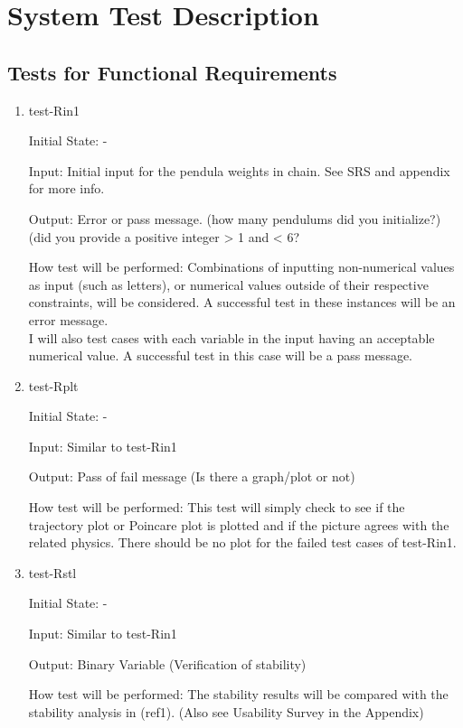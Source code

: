 \documentclass[12pt, titlepage]{article}
\begin{document}


\section{System Test Description}
	
\subsection{Tests for Functional Requirements}

\begin{enumerate}
\item{test-Rin1}	
				
Initial State: -
					
Input: Initial input for the pendula weights in chain. See SRS and appendix for 
more info.
					
Output: Error or pass message. (how many pendulums did you initialize?)
(did you provide a positive integer > 1 and < 6?
					
How test will be performed: Combinations of inputting non-numerical values as 
input  (such as letters), or numerical values outside of their respective 
constraints, will be considered. A successful test in these instances will be 
an error message. \\
I will also test cases with each variable in the input having an 
acceptable numerical value. A successful test in this case will be a pass 
message. 
					
\item{test-Rplt} 

Initial State: -

Input: Similar to test-Rin1 

Output: Pass of fail message (Is there a graph/plot or not)

How test will be performed: This test will simply check to see if the 
trajectory plot or Poincare plot is plotted and if the picture agrees with the 
related physics.
There should be no plot for the failed test cases of test-Rin1. 

\item{test-Rstl} 

Initial State: -

Input: Similar to test-Rin1 

Output: Binary Variable (Verification of stability) 

How test will be performed: The stability results will be compared with the 
stability analysis in (ref1). (Also see Usability
Survey in the Appendix)

\end{enumerate}
\end{document}
